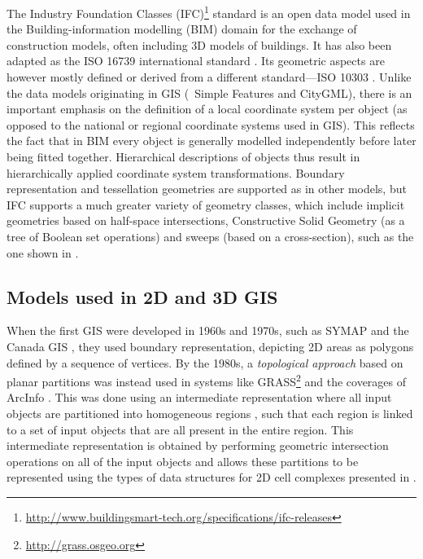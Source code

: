 The Industry Foundation Classes (IFC)\footnote{\url{http://www.buildingsmart-tech.org/specifications/ifc-releases}} standard is an open data model used in the Building-information modelling (BIM) domain for the exchange of construction models, often including 3D models of buildings.
It has also been adapted as the ISO 16739 international standard \citep{ISO16739:2013}.
Its geometric aspects are however mostly defined or derived from a different standard---ISO 10303 \citep{ISO10303:2014}.
Unlike the data models originating in GIS (\eg\ Simple Features and CityGML), there is an important emphasis on the definition of a local coordinate system per object (as opposed to the national or regional coordinate systems used in GIS).
This reflects the fact that in BIM every object is generally modelled independently before later being fitted together.
Hierarchical descriptions of objects thus result in hierarchically applied coordinate system transformations.
Boundary representation and tessellation geometries are supported as in other models, but IFC supports a much greater variety of geometry classes, which include implicit geometries based on half-space intersections, Constructive Solid Geometry (as a tree of Boolean set operations) and sweeps (based on a cross-section), such as the one shown in .

\subsection{Models used in 2D and 3D GIS}

When the first GIS were developed in 1960s and 1970s, such as SYMAP \citep{Chrisman88} and the Canada GIS \citep{Tomlinson88}, they used boundary representation, depicting 2D areas as polygons defined by a sequence of vertices.
By the 1980s, a \emph{topological approach} based on planar partitions was instead used in systems like GRASS\footnote{\url{http://grass.osgeo.org}} and the coverages of ArcInfo \citep{ESRITopology}.
This was done using an intermediate representation where all input objects are partitioned into homogeneous regions \citep{Rossignac89}, such that each region is linked to a set of input objects that are all present in the entire region.
This intermediate representation is obtained by performing geometric intersection operations on all of the input objects and allows these partitions to be represented using the types of data structures for 2D cell complexes presented in .

